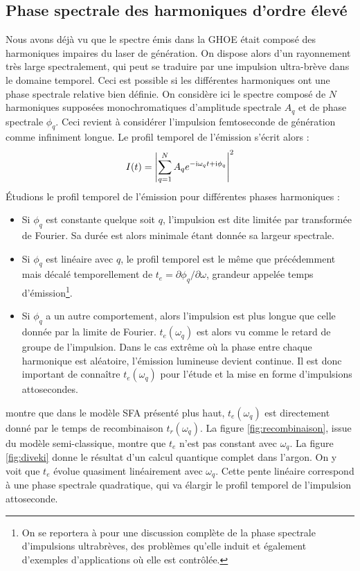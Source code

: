 \subsection{Phase spectrale des harmoniques d'ordre élevé}
Nous avons déjà vu que le spectre émis dans la GHOE était composé des harmoniques impaires du laser de génération. On dispose alors d'un rayonnement très large spectralement, qui peut se traduire par une impulsion ultra-brève dans le domaine temporel. Ceci est possible si les différentes harmoniques ont une phase spectrale relative bien définie. On considère ici le spectre composé de $N$ harmoniques supposées monochromatiques d'amplitude spectrale $A_q$ et de phase spectrale $\phi_q$. Ceci revient à considérer l'impulsion femtoseconde de génération comme infiniment longue. Le profil temporel de l'émission s'écrit alors :
\begin{equation}
I(t) = \left|\sum_{q=1}^N A_q e^{-\mathrm{i}\omega_q t+\mathrm{i}\phi_q}\right|^2
\end{equation}
\'Etudions le profil temporel de l'émission pour différentes phases harmoniques :
\begin{itemize}
\renewcommand{\labelitemi}{$\bullet$}
\setlength\itemsep{1em}
\item Si $\phi_q$ est constante quelque soit $q$, l'impulsion est dite limitée par transformée de Fourier. Sa durée est alors minimale étant donnée sa largeur spectrale.
\item Si $\phi_q$ est linéaire avec $q$, le profil temporel est le même que précédemment mais décalé temporellement de $t_e = \partial\phi_q/\partial\omega$, grandeur appelée temps d'émission\footnote{On se reportera à  pour une discussion complète de la phase spectrale d'impulsions ultrabrèves, des problèmes qu'elle induit et également d'exemples d'applications où elle est contrôlée.}.
\item Si $\phi_q$ a un autre comportement, alors l'impulsion est plus longue que celle donnée par la limite de Fourier. $t_e(\omega_q)$ est alors vu comme le retard de groupe de l'impulsion. Dans le cas extrême où la phase entre chaque harmonique est aléatoire, l'émission lumineuse devient continue. Il est donc important de connaître $t_e(\omega_q)$ pour l'étude et la mise en forme d'impulsions attosecondes.
\end{itemize}
\vspace{\baselineskip}
 montre que dans le modèle SFA présenté plus haut, $t_e(\omega_q)$ est directement donné par le temps de recombinaison $t_r(\omega_q)$. La figure \ref{fig:recombinaison}, issue du modèle semi-classique, montre que $t_e$ n'est pas constant avec $\omega_q$. La figure \ref{fig:diveki} donne le résultat d'un calcul quantique complet dans l'argon. On y voit que $t_e$ évolue quasiment linéairement avec $\omega_q$. Cette pente linéaire correspond à une phase spectrale quadratique, qui va élargir le profil temporel de l'impulsion attoseconde.

